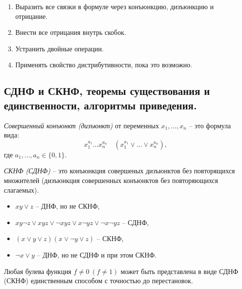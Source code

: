 \begin{note}\leavevmode
    \begin{enumerate}
        \item Выразить все связки в формуле через конъюнкцию, дизъюнкцию и отрицание.
        \item Внести все отрицания внутрь скобок.
        \item Устранить двойные операции.
        \item Применять свойство дистрибутивности, пока это возможно.
    \end{enumerate}
\end{note}

\subsection{СДНФ и СКНФ, теоремы существования и единственности, алгоритмы приведения.}

\begin{definition}
    \emph{Совершенный конъюнкт (дизъюнкт)} от переменных $x_1,\ldots,x_n$ -- это формула вида:
    \[
        x_1^{a_1}\ldots x_n^{a_n} \quad (x_1^{a_1}\lor \ldots \lor x_n^{a_n}),
    \]
    где $a_1,\ldots,a_n \in \{0,1\}$.
\end{definition}

\begin{definition}
    \emph{СКНФ (СДНФ)} -- это конъюнкция совершеных дизъюнктов без повторящихся множителей (дизъюнкция совершенных конъюнктов без повторяющихся слагаемых).
\end{definition}

\begin{example}\leavevmode
    \begin{itemize}
        \item $xy \lor z$ -- ДНФ, но не СКНФ,
        \item $xy\lnot z \lor xyz \lor \lnot xyz \lor x\lnot yz \lor \lnot x\lnot yz$ -- СДНФ,
        \item $(x\lor y\lor z)(x \lor \lnot y \lor z)$ -- СКНФ,
        \item $\lnot x \lor y$ -- ДНФ, но не СДНФ и при этом СКНФ.
    \end{itemize}
\end{example}

\begin{theorem}
    Любая булева функция $f\ne 0 \ (f\ne1)$ может быть представлена в виде СДНФ (СКНФ) единственным способом с точностью до перестановок.
\end{theorem}

